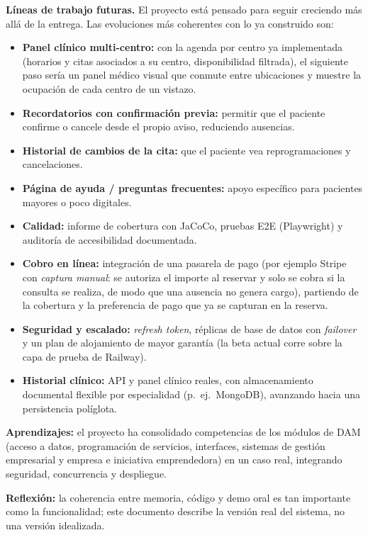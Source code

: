 \documentclass[12pt,a4paper]{report}
\begin{document}
\textbf{Líneas de trabajo futuras.} El proyecto está pensado para seguir creciendo más allá de la entrega. Las evoluciones más coherentes con lo ya construido son:

\begin{itemize}
  \item \textbf{Panel clínico multi-centro:} con la agenda por centro ya implementada (horarios y citas asociados a su centro, disponibilidad filtrada), el siguiente paso sería un panel médico visual que conmute entre ubicaciones y muestre la ocupación de cada centro de un vistazo.
  \item \textbf{Recordatorios con confirmación previa:} permitir que el paciente confirme o cancele desde el propio aviso, reduciendo ausencias.
  \item \textbf{Historial de cambios de la cita:} que el paciente vea reprogramaciones y cancelaciones.
  \item \textbf{Página de ayuda / preguntas frecuentes:} apoyo específico para pacientes mayores o poco digitales.
  \item \textbf{Calidad:} informe de cobertura con JaCoCo, pruebas E2E (Playwright) y auditoría de accesibilidad documentada.
  \item \textbf{Cobro en línea:} integración de una pasarela de pago (por ejemplo Stripe con \emph{captura manual}: se autoriza el importe al reservar y solo se cobra si la consulta se realiza, de modo que una ausencia no genera cargo), partiendo de la cobertura y la preferencia de pago que ya se capturan en la reserva.
  \item \textbf{Seguridad y escalado:} \emph{refresh token}, réplicas de base de datos con \emph{failover} y un plan de alojamiento de mayor garantía (la beta actual corre sobre la capa de prueba de Railway).
  \item \textbf{Historial clínico:} API y panel clínico reales, con almacenamiento documental flexible por especialidad (p.\ ej.\ MongoDB), avanzando hacia una persistencia políglota.
\end{itemize}

\textbf{Aprendizajes:} el proyecto ha consolidado competencias de los módulos de DAM (acceso a datos, programación de servicios, interfaces, sistemas de gestión empresarial y empresa e iniciativa emprendedora) en un caso real, integrando seguridad, concurrencia y despliegue.

\textbf{Reflexión:} la coherencia entre memoria, código y demo oral es tan importante como la funcionalidad; este documento describe la versión real del sistema, no una versión idealizada.
\end{document}
